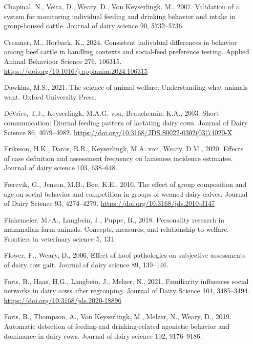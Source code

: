 \documentclass[
]{article}
\newlength{\cslhangindent}
\newenvironment{CSLReferences}[2] %
 {\begin{list}{}{%
  \setlength{\itemindent}{0pt}
  \setlength{\leftmargin}{0pt}
  \setlength{\parsep}{0pt}
  \ifodd #1
   \setlength{\leftmargin}{\cslhangindent}
   \setlength{\itemindent}{-1\cslhangindent}
  \fi
  \setlength{\itemsep}{#2\baselineskip}}}
 {\end{list}}
\begin{document}
\begin{CSLReferences}{1}{0}
Chapinal, N., Veira, D., Weary, D., Von Keyserlingk, M., 2007.
Validation of a system for monitoring individual feeding and drinking
behavior and intake in group-housed cattle. Journal of dairy science 90,
5732--5736.

Creamer, M., Horback, K., 2024. Consistent individual differences in
behavior among beef cattle in handling contexts and social-feed
preference testing. Applied Animal Behaviour Science 276, 106315.
\url{https://doi.org/10.1016/j.applanim.2024.106315}

Dawkins, M.S., 2021. The science of animal welfare: Understanding what
animals want. Oxford University Press.

DeVries, T.J., Keyserlingk, M.A.G. von, Beauchemin, K.A., 2003. Short
communication: Diurnal feeding pattern of lactating dairy cows. Journal
of Dairy Science 86, 4079--4082.
\url{https://doi.org/10.3168/JDS.S0022-0302(03)74020-X}

Eriksson, H.K., Daros, R.R., Keyserlingk, M.A. von, Weary, D.M., 2020.
Effects of case definition and assessment frequency on lameness
incidence estimates. Journal of dairy science 103, 638--648.

Færevik, G., Jensen, M.B., Bøe, K.E., 2010. The effect of group
composition and age on social behavior and competition in groups of
weaned dairy calves. Journal of Dairy Science 93, 4274--4279.
\url{https://doi.org/10.3168/jds.2010-3147}

Finkemeier, M.-A., Langbein, J., Puppe, B., 2018. Personality research
in mammalian farm animals: Concepts, measures, and relationship to
welfare. Frontiers in veterinary science 5, 131.

Flower, F., Weary, D., 2006. Effect of hoof pathologies on subjective
assessments of dairy cow gait. Journal of dairy science 89, 139--146.

Foris, B., Haas, H.G., Langbein, J., Melzer, N., 2021. Familiarity
influences social networks in dairy cows after regrouping. Journal of
Dairy Science 104, 3485--3494.
\url{https://doi.org/10.3168/jds.2020-18896}

Foris, B., Thompson, A., Von Keyserlingk, M., Melzer, N., Weary, D.,
2019. Automatic detection of feeding-and drinking-related agonistic
behavior and dominance in dairy cows. Journal of dairy science 102,
9176--9186.


\end{CSLReferences}
\end{document}
